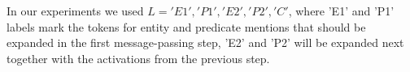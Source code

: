 

In our experiments we used $L={'E1', 'P1', 'E2', 'P2', 'C'}$, where 'E1' and 'P1' labels mark the tokens for entity and predicate mentions that should be expanded in the first message-passing step, 'E2' and 'P2' will be expanded next together with the activations from the previous step.







